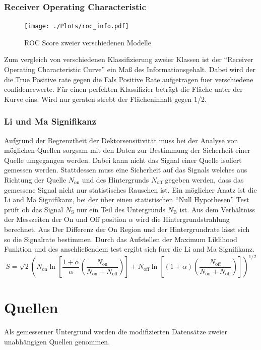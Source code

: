 \subsection{Receiver Operating Characteristic}
\begin{figure}
  \centering
  \texttt{[image: ./Plots/roc\_info.pdf]}
  \caption{ROC Score zweier verschiedenen Modelle}
\end{figure}
Zum vergleich von verschiedenen Klassifizierung zweier Klassen ist der ``Receiver Operating Characteristic Curve'' ein Maß des Informationsgehalt. 
Dabei wird der die True Positive rate gegen die Fals Positive Rate aufgetragen fuer verschiedene confidencewerte. 
Für einen perfekten Klassifizier beträgt die Fläche unter der Kurve eins. 
Wird nur geraten strebt der Flächeninhalt gegen 1/2.
\subsection{Li und Ma Signifikanz}
Aufgrund der Begrenztheit der Dektorsensitivität muss bei der Analyse von möglichen Quellen sorgsam mit den Daten zur Bestimmung der Sicherheit einer Quelle umgegangen werden.
Dabei kann nicht das Signal einer Quelle isoliert gemessen werden. 
Stattdessen muss eine Sicherheit auf das Signals welches aus Richtung der Quelle $N_\text{on}$ und des Hintergrunds $N_\text{off}$ gegeben werden, dass das gemessene Signal nicht nur statistisches Rauschen ist.
Ein möglicher Anatz ist die Li and Ma Signifikanz, bei der über einen statistischen ``Null Hypothesen'' Test prüft ob das Signal $N_\text{S}$ nur ein Teil des Untergrunds $N_\text{B}$ ist. 
Aus dem Verhältniss der Messzeiten der On und Off position $\alpha$ wird die Hintergrundstrahlung berechnet. 
Aus Der Differenz der On Region und der Hintergrundrate lässt sich so die Signalrate bestimmen. 
Durch das Aufstellen der Maximum Liklihood Funktion und des anschließendem test ergibt sich fuer die Li and Ma Signifikanz.
\begin{equation}
S = \sqrt{2} \left( N_\text{on} \ln \left[ \frac{1+ \alpha}{\alpha}\left( \frac{N_\text{on}}{N_\text{on} + N_\text{off}} \right) \right] + N_\text{off} \ln \left[ \left( 1+ \alpha \right) \left( \frac{N_\text{off}}{N_\text{on} + N_\text{off}} \right) \right] \right)^{1/2}
\end{equation}

\chapter{Quellen}
Als gemesserner Untergrund werden die modifizierten Datensätze zweier unabhängigen Quellen genommen. 

